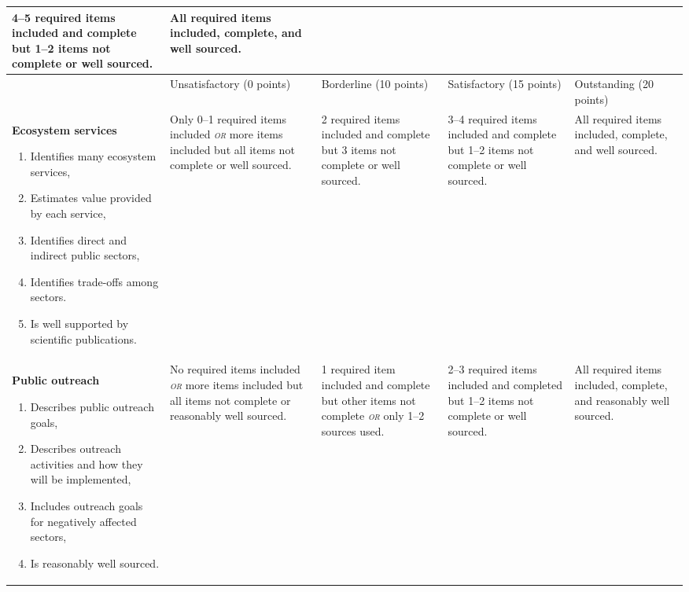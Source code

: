 \documentclass[10pt, twoside]{article}
\begin{document}
\begin{landscape}
{\begin{longtable}[l]{@{}L{5cm}L{4cm}L{4cm}L{4cm}L{4cm}@{}}
4–5 required items included and complete but 1–2 items not complete or well sourced. &%
All required items included, complete, and well sourced.\\[-1em]
\midrule
\newpage
\midrule
 & Unsatisfactory (0 points) & Borderline (10 points) & Satisfactory (15 points) & Outstanding (20 points) \\ 
\midrule
\textbf{Ecosystem services}\par
\vspace{-0.5\baselineskip}
\begin{enumerate}
\item Identifies many ecosystem services,
\item Estimates value provided by each service,
\item Identifies direct and indirect public sectors,
\item Identifies trade-offs among sectors.
\item Is well supported by scientific publications.
\end{enumerate} &%
Only 0–1 required items included \textit{\textsc{or}} more items included but all items not complete or well sourced. &%
2 required items included and complete but 3 items not complete or well sourced.   &%
3–4 required items included and complete but 1–2 items not complete or well sourced.  &%
All required items included, complete, and well sourced.\\[-1em]
\midrule
\textbf{Public outreach}\par
\vspace{-0.5\baselineskip}
\begin{enumerate}
\item Describes public outreach goals,
\item Describes outreach activities and how they will be implemented,
\item Includes outreach goals for negatively affected sectors,
\item Is reasonably well sourced.
\end{enumerate} &%
No required items included \textit{\textsc{or}} more items included but all items not complete or reasonably well sourced. &%
1 required item included and complete but other items not complete \emph{\textsc{or}} only 1–2 sources used. &%
2–3 required items included and completed but 1–2 items not complete or well sourced. &%
All required items included, complete, and reasonably well sourced.\\[-1em]

\end{longtable}}
\end{landscape}
\end{document}
